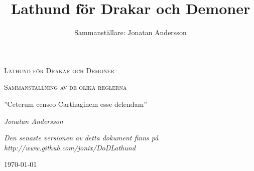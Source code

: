 \documentclass[a4paper, 10pt, titlepage]{article}
\title{Lathund för Drakar och Demoner}
\author{Sammanställare: Jonatan Andersson}
\date{ }
\begin{document}
\begin{titlepage}
        \centering
        {\scshape\LARGE Lathund för Drakar och Demoner \par}
        \vspace{1cm}
        {\scshape\Large Sammanställning av de olika reglerna\par}
        \vspace{1.5cm}
        {\huge ''Ceterum censeo Carthaginem esse delendam''\par}
        \vspace{2cm}
        {\Large\itshape Jonatan Andersson\par}
        \vspace{2cm}
        {\small\itshape Den senaste versionen av detta dokument finns på http://www.github.com/jonix/DoDLathund\par}
        \vfill
        {\large \today\par}
        \vfill


\end{titlepage}

\tableofcontents
\newpage
\end{document}
